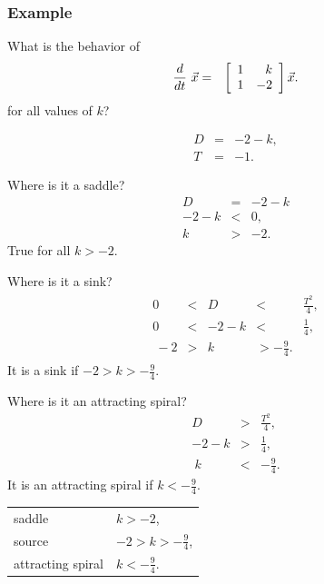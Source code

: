 \begin{frame}
  \frametitle{Example}

  What is the behavior of
  \begin{eqnarray*}
    \deriv{~}{t} \vec{x} & = & \arrayTwo{1}{k}{1}{-2} \vec{x}.
  \end{eqnarray*}
  for all values of $k$?

  {
    \begin{eqnarray*}
      D & = & -2-k, \\
      T & = & -1.
    \end{eqnarray*}
  }



  {
    Where is it a saddle?
    \begin{eqnarray*}
      D & = & -2-k \\
      -2-k & < & 0, \\ 
      k & > & -2.
    \end{eqnarray*}
    True for all $k>-2$.
  }


  {
    Where is it a sink?
    \begin{eqnarray*}
      \begin{array}{rcccl}
        0 & < & D & < & \frac{T^2}{4}, \\
        0 & < & -2-k & < & \frac{1}{4}, \\\
        -2 & > &  k & > -\frac{9}{4}.& 
      \end{array}
    \end{eqnarray*}
    It is a sink if $-2 > k  > -\frac{9}{4}$.
  }

  {
    Where is it an attracting spiral?
    \begin{eqnarray*}
        D  & > & \frac{T^2}{4}, \\
        -2-k & > & \frac{1}{4}, \\\
        k  & < & -\frac{9}{4}.
    \end{eqnarray*}
    It is an attracting spiral if $k < -\frac{9}{4}$.
  }

  {
    \begin{tabular}{ll}
      saddle            & $k>-2$, \\
      source            & $-2 > k  > -\frac{9}{4}$, \\
      attracting spiral & $k < -\frac{9}{4}.$
    \end{tabular}
  }



\end{frame}


